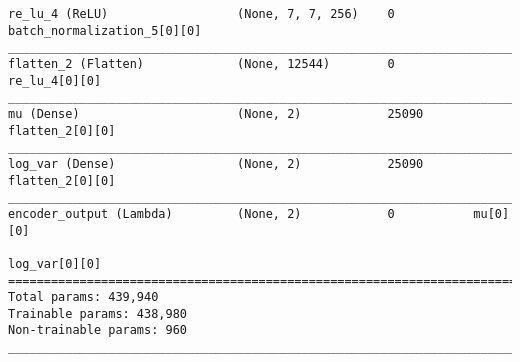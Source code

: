 \begin{lstlisting}[caption={\textsc{Mnist}-\ac{VAE}-\ac{GAN} Encoder},captionpos=b,basicstyle=\tiny, label={lst:mnist-vae-encoder}]
re_lu_4 (ReLU)                  (None, 7, 7, 256)    0           batch_normalization_5[0][0]
__________________________________________________________________________________________________
flatten_2 (Flatten)             (None, 12544)        0           re_lu_4[0][0]
__________________________________________________________________________________________________
mu (Dense)                      (None, 2)            25090       flatten_2[0][0]
__________________________________________________________________________________________________
log_var (Dense)                 (None, 2)            25090       flatten_2[0][0]
__________________________________________________________________________________________________
encoder_output (Lambda)         (None, 2)            0           mu[0][0]
                                                                 log_var[0][0]
==================================================================================================
Total params: 439,940
Trainable params: 438,980
Non-trainable params: 960
__________________________________________________________________________________________________
\end{lstlisting}